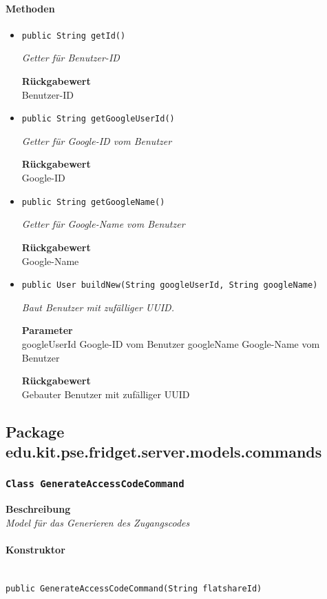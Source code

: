    \paragraph*{Methoden}
    \begin{itemize}
    	\item{\texttt{public String getId()}}
    	
    	\textit{Getter für Benutzer-ID}
    	
    	
    	
    	\textbf{Rückgabewert} \\
    	Benutzer-ID        \item{\texttt{public String getGoogleUserId()}}
    	
    	\textit{Getter für Google-ID vom Benutzer}
    	
    	
    	
    	\textbf{Rückgabewert} \\
    	Google-ID        \item{\texttt{public String getGoogleName()}}
    	
    	\textit{Getter für Google-Name vom Benutzer}
    	
    	
    	
    	\textbf{Rückgabewert} \\
    	Google-Name        \item{\texttt{public User buildNew(String googleUserId, String googleName)}}
    	
    	\textit{Baut Benutzer mit zufälliger UUID.}
    	
    	\textbf{Parameter} \\
    	googleUserId Google-ID vom Benutzer
    	googleName Google-Name vom Benutzer
    	
    	\textbf{Rückgabewert} \\
    	Gebauter Benutzer mit zufälliger UUID
    \end{itemize}
    \subsection{Package edu.kit.pse.fridget.server.models.commands}
    \subsubsection{\texttt{Class GenerateAccessCodeCommand}}
    \textbf{Beschreibung} \\
    \textit{Model für das Generieren des Zugangscodes}
    \paragraph*{Konstruktor}\mbox{} \\
    \texttt{public GenerateAccessCodeCommand(String flatshareId)} \\
